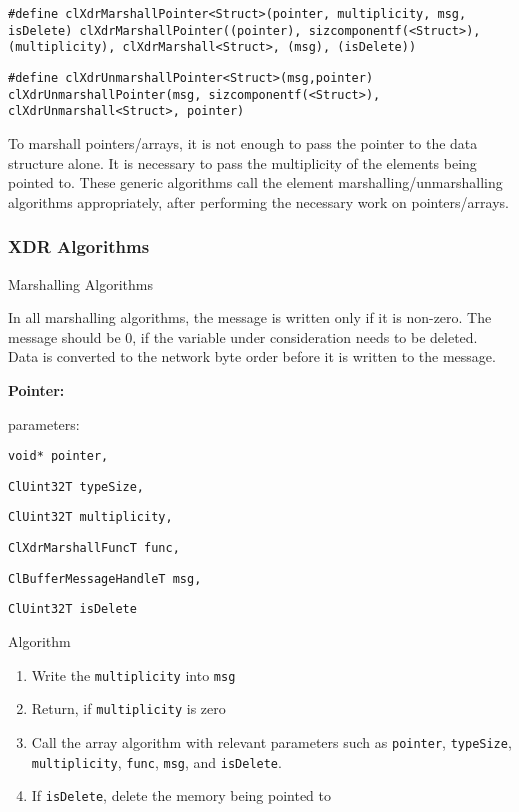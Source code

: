 \begin{flushleft}
{\tt{\#define clXdrMarshallPointer<Struct>(pointer, multiplicity, msg, isDelete) clXdrMarshallPointer((pointer), sizcomponentf(<Struct>), (multiplicity), 
clXdrMarshall<Struct>, (msg), (isDelete))}}\par

{\tt{\#define clXdrUnmarshallPointer<Struct>(msg,pointer)    clXdrUnmarshallPointer(msg, sizcomponentf(<Struct>), clXdrUnmarshall<Struct>, pointer)}}\par

To marshall pointers/arrays, it is not enough to pass the pointer to the data structure alone. It is necessary to pass the multiplicity of the elements 
being pointed to. These generic algorithms call the element marshalling/unmarshalling algorithms appropriately, after performing the necessary 
work on pointers/arrays.

\subsubsection{XDR Algorithms}

\begin{Desc}
\item
[Marshalling Algorithms]
\end{Desc}
In all marshalling algorithms, the message is written only if it is non-zero. The message should be 0, if the variable under consideration needs to be 
deleted. Data is converted to the network byte order before it is written to the message.

\textbf{Pointer:}\par
parameters:\par
{\tt{void* pointer,}}\par
{\tt{ClUint32T typeSize,}}\par
{\tt{ClUint32T multiplicity,}}\par
{\tt{ClXdrMarshallFuncT func,}}\par
{\tt{ClBufferMessageHandleT msg,}}\par
{\tt{ClUint32T isDelete}}\par
Algorithm
\begin{enumerate}
\item
Write the {\tt{multiplicity}} into {\tt{msg}}
\item
Return, if {\tt{multiplicity}} is zero
\item
Call the array algorithm with relevant parameters such as {\tt{pointer}}, {\tt{typeSize}}, {\tt{multiplicity}}, {\tt{func}}, {\tt{msg}}, and 
{\tt{isDelete}}.
\item
If {\tt{isDelete}}, delete the memory being pointed to
\end{enumerate}


\end{flushleft}
